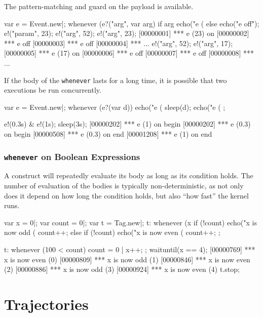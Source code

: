 The pattern-matching and guard on the payload is available.

\begin{urbiunchecked}[firstnumber=1]
var e = Event.new|;
whenever (e?("arg", var arg) if arg %
  echo("e (%
else
  echo("e off");
e!("param", 23);
e!("arg", 52);
e!("arg", 23);
[00000001] *** e (23) on
[00000002] *** e off
[00000003] *** e off
[00000004] *** ...
e!("arg", 52);
e!("arg", 17);
[00000005] *** e (17) on
[00000006] *** e off
[00000007] *** e off
[00000008] *** ...
\end{urbiunchecked}


If the body of the \lstinline{whenever} lasts for a long time, it is
possible that two executions be run concurrently.

\begin{urbiscript}[firstnumber=1]
var e = Event.new|;
whenever (e?(var d))
{
  echo("e (%
  sleep(d);
  echo("e (%
};

e!(0.3s) & e!(1s);
sleep(3s);
[00000202] *** e (1) on begin
[00000202] *** e (0.3) on begin
[00000508] *** e (0.3) on end
[00001208] *** e (1) on end
\end{urbiscript}

\subsubsection{\lstinline{whenever} on Boolean Expressions}

A  construct will repeatedly evaluate its body as long as
its condition holds.  The number of evaluation of the bodies is typically
non-deterministic, as not only does it depend on how long the condition
holds, but also ``how fast'' the \urbi kernel runs.

\begin{urbiscript}[firstnumber=1]
var x = 0|;
var count = 0|;
var t = Tag.new|;
t:
  whenever (x %
  {
    if (!count)
      echo("x is now odd (%
    count++;
  }
  else
  {
    if (!count)
      echo("x is now even (%
    count++;
  };

t:
  whenever (100 < count)
  {
    count = 0 |
    x++;
  };
waituntil(x == 4);
[00000769] *** x is now even (0)
[00000809] *** x is now odd (1)
[00000846] *** x is now even (2)
[00000886] *** x is now odd (3)
[00000924] *** x is now even (4)
t.stop;
\end{urbiscript}



\section{Trajectories}
\label{sec:lang:traj}

